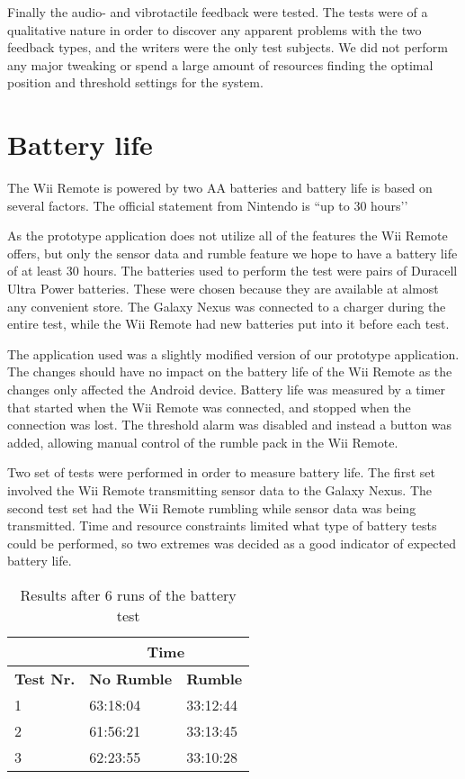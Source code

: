 Finally the audio- and vibrotactile feedback were tested. The tests were of a qualitative nature in order to discover any apparent problems with the two feedback types, and the writers were the only test subjects. We did not perform any major tweaking or spend a large amount of resources finding the optimal position and threshold settings for the system.

\section{Battery life}
The Wii Remote is powered by two AA batteries and battery life is based on several factors. The official statement from Nintendo is ``up to 30 hours’’ \cite{wiiBattery}

As the prototype application does not utilize all of the features the Wii Remote offers, but only the sensor data and rumble feature we hope to have a battery life of at least 30 hours. The batteries used to perform the test were pairs of Duracell Ultra Power batteries. These were chosen because they are available at almost any convenient store. The Galaxy Nexus was connected to a charger during the entire test, while the Wii Remote had new batteries put into it before each test.

The application used was a slightly modified version of our prototype application. The changes should have no impact on the battery life of the Wii Remote as the changes only affected the Android device. Battery life was measured by a timer that started when the Wii Remote was connected,  and stopped when the connection was lost. The threshold alarm was disabled and instead a button was added, allowing manual control of the rumble pack in the Wii Remote.

Two set of tests were performed in order to measure battery life. The first set involved the Wii Remote transmitting sensor data to the Galaxy Nexus. The second test set had the Wii Remote rumbling while sensor data was being transmitted. Time and resource constraints limited what type of battery tests could be performed, so two extremes was decided as a good indicator of expected battery life. 

\begin{table}[h]
\centering
\setlength{\extrarowheight}{0,2cm}
\begin{tabular}{p{2cm}|p{4.75cm}|p{4.75cm}|}
\cline{2-3}
&\multicolumn{2}{c|}{\textbf{Time}}\\ \hline
\textbf{Test Nr.} &\textbf{No Rumble} & \textbf{Rumble} \\ \hline
1 & 63:18:04 & 33:12:44 \\ \hline
2 & 61:56:21 & 33:13:45 \\ \hline
3 & 62:23:55 & 33:10:28 \\ \hline
\end{tabular}
\caption{Results after 6 runs of the battery test}
\label{tab:batteryLife}
\end{table}

